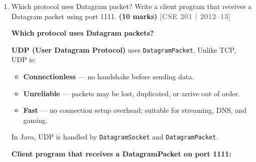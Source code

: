 \documentclass[12pt,a3paper]{article}
\newcommand{\yr}[1]{\hfill\textcolor{gray}{\small\textbf{[#1]}}}
\newcommand{\mk}[1]{\textcolor{orange!70!black}{\small\textbf{(#1 marks)}}}
\begin{document}
\begin{enumerate}
\begin{tcolorbox}[enhanced,breakable,ansbox,
  colback=cB!4,colframe=cB,boxrule=0.8pt,arc=5pt,
  title={\textbf{Answer — Why Socket Implements
  AutoCloseable}},
  fonttitle=\bfseries\color{white},colbacktitle=cB]
\begin{lstlisting}[language=Java]
// WITH AutoCloseable (try-with-resources -- clean and safe)
try (Socket s = new Socket("localhost", 8080);
     BufferedReader in = new BufferedReader(
         new InputStreamReader(s.getInputStream()));
     PrintWriter out = new PrintWriter(
         s.getOutputStream(), true)) {

    out.println("Hello server");
    System.out.println("Server says: " + in.readLine());

}   // s, in, out all closed automatically here,
    // even if an exception is thrown above
\end{lstlisting}

\textbf{Key benefit:} The try-with-resources block
calls \texttt{s.close()} (and also closes the
\texttt{BufferedReader} and \texttt{PrintWriter}
declared in the same block) in
\textbf{reverse declaration order}, ensuring no
descriptor is leaked regardless of how the block
exits.

\end{tcolorbox}


\item Which protocol uses Datagram packet? Write a client program that receives a Datagram packet using port 1111. \mk{10}
\yr{CSE 201 | 2012--13}

\begin{tcolorbox}[enhanced,breakable,ansbox,
  colback=cB!4,colframe=cB,boxrule=0.8pt,arc=5pt,
  title={\textbf{Answer — Datagram Protocol and UDP Client}},
  fonttitle=\bfseries\color{white},colbacktitle=cB]

\textbf{Which protocol uses Datagram packets?}

\textbf{UDP (User Datagram Protocol)} uses
\texttt{DatagramPacket}. Unlike TCP, UDP is:
\begin{itemize}[itemsep=2pt]
  \item \textbf{Connectionless} --- no handshake before
  sending data.
  \item \textbf{Unreliable} --- packets may be lost,
  duplicated, or arrive out of order.
  \item \textbf{Fast} --- no connection setup overhead;
  suitable for streaming, DNS, and gaming.
\end{itemize}

In Java, UDP is handled by
\texttt{DatagramSocket} and \texttt{DatagramPacket}.

\medskip
\textbf{Client program that receives a DatagramPacket
on port 1111:}


\end{tcolorbox}
\end{enumerate}
\end{document}
